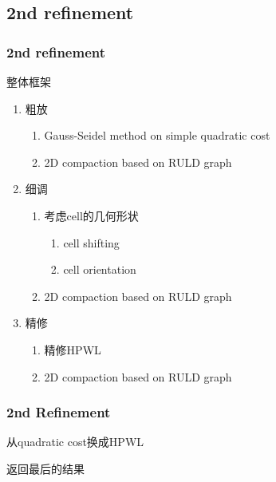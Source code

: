\documentclass[UTF8,lualatex]{ctexbeamer}
\begin{document}
\subsection{2nd refinement}

\begin{frame}
    \frametitle{2nd refinement}
    
    \begin{block}{整体框架}
        \begin{enumerate}
            \color{gray}
            \item 粗放
                \begin{enumerate}
                    \color{gray}
                    \item Gauss-Seidel method on simple quadratic cost
                    \item 2D compaction based on RULD graph
                \end{enumerate}
            \item 细调
                \begin{enumerate}
                    \color{gray}
                    \item 考虑cell的几何形状
                        \begin{enumerate}
                            \color{gray}
                            \item cell shifting
                            \item cell orientation
                        \end{enumerate}
                    \item 2D compaction based on RULD graph
                \end{enumerate}
            \item 精修
                \begin{enumerate}
                    \item 精修HPWL
                    \color{gray}
                    \item 2D compaction based on RULD graph
                \end{enumerate}
        \end{enumerate}
    \end{block}
\end{frame}

\begin{frame}
    \frametitle{2nd Refinement}

    \begin{exampleblock}{从quadratic cost换成HPWL}
        \footnotesize
        \begin{algorithmic}[1]
                \State {}
                \State {}
                \State {}
            \EndFor
            \State 返回最后的结果
        \end{algorithmic}
    \end{exampleblock}
\end{frame}
\end{document}
